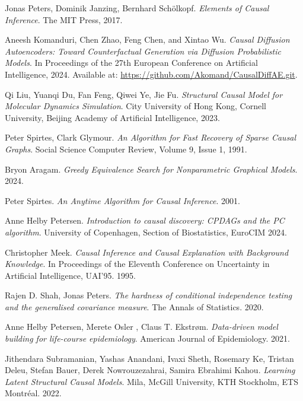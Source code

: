 \documentclass{article}
\begin{document}
	
	\begin{thebibliography}{9}
		
	Jonas Peters, Dominik Janzing, Bernhard Schölkopf. 
	\textit{Elements of Causal Inference}. 
	The MIT Press, 2017.
	
	Aneesh Komanduri, Chen Zhao, Feng Chen, and Xintao Wu. \textit{Causal Diffusion Autoencoders: Toward Counterfactual Generation via Diffusion Probabilistic Models}. In Proceedings of the 27th European Conference on Artificial Intelligence, 2024. Available at: \url{https://github.com/Akomand/CausalDiffAE.git}.
	
	Qi Liu, Yuanqi Du, Fan Feng, Qiwei Ye, Jie Fu. 
	\textit{Structural Causal Model for Molecular Dynamics Simulation}. City University of Hong Kong, Cornell University, Beijing Academy of Artificial Intelligence, 2023.
	
	Peter Spirtes, Clark Glymour. 
	\textit{An Algorithm for Fast Recovery of Sparse Causal Graphs}. 
	Social Science Computer Review, Volume 9, Issue 1, 1991.
	
	Bryon Aragam. 
	\textit{Greedy Equivalence Search for Nonparametric Graphical Models}. 
	2024.
	
	Peter Spirtes. 
	\textit{An Anytime Algorithm for Causal Inference}. 
	2001.
	
	Anne Helby Petersen.
	\textit{Introduction to causal discovery: CPDAGs and the PC algorithm}. 
	University of Copenhagen, Section of Biostatistics, EuroCIM 2024.
	
	Christopher Meek. 
	\textit{Causal Inference and Causal Explanation with Background Knowledge}. 
	In Proceedings of the Eleventh Conference on Uncertainty in Artificial Intelligence, UAI’95. 
	1995.
	
	Rajen D. Shah, Jonas Peters. \textit{The hardness of conditional independence testing and the generalised covariance measure}.
	The Annals of Statistics. 
	2020.
	
	Anne Helby Petersen, Merete Osler , Claus T. Ekstrøm. \textit{Data-driven model building for life-course epidemiology}. American Journal of Epidemiology. 
	2021.
	
	Jithendara Subramanian, Yashas Anandani, Ivaxi Sheth, Rosemary Ke, Tristan Deleu, Stefan Bauer, Derek Nowrouzezahrai, Samira Ebrahimi Kahou. 
	\textit{Learning Latent Structural Causal Models}. 
	Mila, McGill University, KTH Stockholm, ETS Montréal.
	2022.
	

\end{thebibliography}
\end{document}
